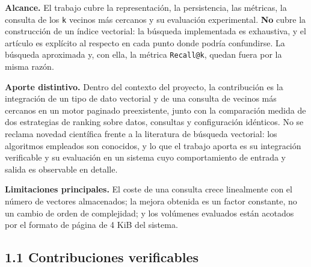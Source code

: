 \documentclass[11pt,a4paper]{article}
\let\pandocsubsection\subsection
\let\subsection\section
\let\subsubsection\pandocsubsection
\begin{document}
\textbf{Alcance.} El trabajo cubre la representación, la persistencia,
las métricas, la consulta de los \texttt{k} vecinos más cercanos y su
evaluación experimental. \textbf{No} cubre la construcción de un índice
vectorial: la búsqueda implementada es exhaustiva, y el artículo es
explícito al respecto en cada punto donde podría confundirse. La
búsqueda aproximada y, con ella, la métrica \texttt{Recall@k}, quedan
fuera por la misma razón.

\textbf{Aporte distintivo.} Dentro del contexto del proyecto, la
contribución es la integración de un tipo de dato vectorial y de una
consulta de vecinos más cercanos en un motor paginado preexistente,
junto con la comparación medida de dos estrategias de ranking sobre
datos, consultas y configuración idénticos. No se reclama novedad
científica frente a la literatura de búsqueda vectorial: los algoritmos
empleados son conocidos, y lo que el trabajo aporta es su integración
verificable y su evaluación en un sistema cuyo comportamiento de entrada
y salida es observable en detalle.

\textbf{Limitaciones principales.} El coste de una consulta crece
linealmente con el número de vectores almacenados; la mejora obtenida es
un factor constante, no un cambio de orden de complejidad; y los
volúmenes evaluados están acotados por el formato de página de 4 KiB del
sistema.

\subsubsection{1.1 Contribuciones
verificables}\label{11-contribuciones-verificables}
\end{document}
